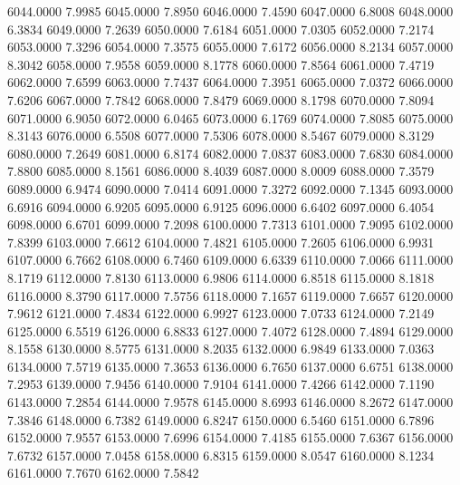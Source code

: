 6044.0000      7.9985
6045.0000      7.8950
6046.0000      7.4590
6047.0000      6.8008
6048.0000      6.3834
6049.0000      7.2639
6050.0000      7.6184
6051.0000      7.0305
6052.0000      7.2174
6053.0000      7.3296
6054.0000      7.3575
6055.0000      7.6172
6056.0000      8.2134
6057.0000      8.3042
6058.0000      7.9558
6059.0000      8.1778
6060.0000      7.8564
6061.0000      7.4719
6062.0000      7.6599
6063.0000      7.7437
6064.0000      7.3951
6065.0000      7.0372
6066.0000      7.6206
6067.0000      7.7842
6068.0000      7.8479
6069.0000      8.1798
6070.0000      7.8094
6071.0000      6.9050
6072.0000      6.0465
6073.0000      6.1769
6074.0000      7.8085
6075.0000      8.3143
6076.0000      6.5508
6077.0000      7.5306
6078.0000      8.5467
6079.0000      8.3129
6080.0000      7.2649
6081.0000      6.8174
6082.0000      7.0837
6083.0000      7.6830
6084.0000      7.8800
6085.0000      8.1561
6086.0000      8.4039
6087.0000      8.0009
6088.0000      7.3579
6089.0000      6.9474
6090.0000      7.0414
6091.0000      7.3272
6092.0000      7.1345
6093.0000      6.6916
6094.0000      6.9205
6095.0000      6.9125
6096.0000      6.6402
6097.0000      6.4054
6098.0000      6.6701
6099.0000      7.2098
6100.0000      7.7313
6101.0000      7.9095
6102.0000      7.8399
6103.0000      7.6612
6104.0000      7.4821
6105.0000      7.2605
6106.0000      6.9931
6107.0000      6.7662
6108.0000      6.7460
6109.0000      6.6339
6110.0000      7.0066
6111.0000      8.1719
6112.0000      7.8130
6113.0000      6.9806
6114.0000      6.8518
6115.0000      8.1818
6116.0000      8.3790
6117.0000      7.5756
6118.0000      7.1657
6119.0000      7.6657
6120.0000      7.9612
6121.0000      7.4834
6122.0000      6.9927
6123.0000      7.0733
6124.0000      7.2149
6125.0000      6.5519
6126.0000      6.8833
6127.0000      7.4072
6128.0000      7.4894
6129.0000      8.1558
6130.0000      8.5775
6131.0000      8.2035
6132.0000      6.9849
6133.0000      7.0363
6134.0000      7.5719
6135.0000      7.3653
6136.0000      6.7650
6137.0000      6.6751
6138.0000      7.2953
6139.0000      7.9456
6140.0000      7.9104
6141.0000      7.4266
6142.0000      7.1190
6143.0000      7.2854
6144.0000      7.9578
6145.0000      8.6993
6146.0000      8.2672
6147.0000      7.3846
6148.0000      6.7382
6149.0000      6.8247
6150.0000      6.5460
6151.0000      6.7896
6152.0000      7.9557
6153.0000      7.6996
6154.0000      7.4185
6155.0000      7.6367
6156.0000      7.6732
6157.0000      7.0458
6158.0000      6.8315
6159.0000      8.0547
6160.0000      8.1234
6161.0000      7.7670
6162.0000      7.5842
